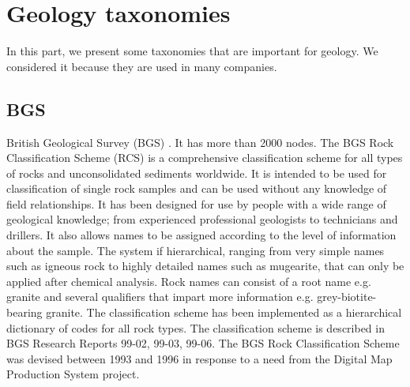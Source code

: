 \chapter{Geology taxonomies}
In this part, we present some taxonomies that are important for geology. We considered it because they are used in many companies.
\section{BGS}
British Geological Survey (BGS) . It has more than 2000 nodes.  The BGS Rock Classification Scheme (RCS) is a comprehensive classification scheme for all types of rocks and unconsolidated sediments worldwide. It is intended to be used for classification of single rock samples and can be used without any knowledge of field relationships. It has been designed for use by people with a wide range of geological knowledge; from experienced professional geologists to technicians and drillers. It also allows names to be assigned according to the level of information about the sample. The system if hierarchical, ranging from very simple names such as igneous rock to highly detailed names such as mugearite, that can only be applied after chemical analysis. Rock names can consist of a root name e.g. granite and several qualifiers that impart more information e.g. grey-biotite-bearing granite. The classification scheme has been implemented as a hierarchical dictionary of codes for all rock types. The classification scheme is described in BGS Research Reports 99-02, 99-03, 99-06. The BGS Rock Classification Scheme was devised between 1993 and 1996 in response to a need from the Digital Map Production System project.
